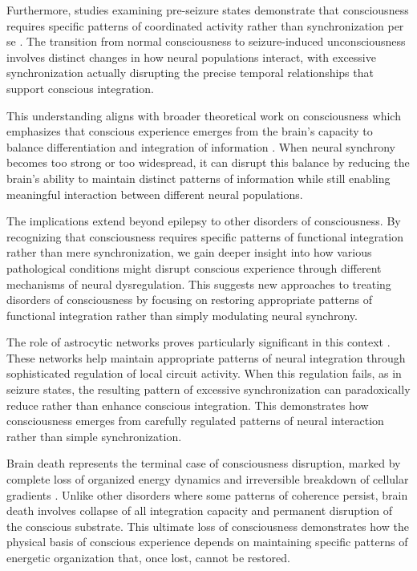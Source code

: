 \begin{refsection}
Furthermore, studies examining pre-seizure states demonstrate that consciousness requires specific patterns of coordinated activity rather than synchronization per se \cite{LeVanQuyen2002}. The transition from normal consciousness to seizure-induced unconsciousness involves distinct changes in how neural populations interact, with excessive synchronization actually disrupting the precise temporal relationships that support conscious integration.

This understanding aligns with broader theoretical work on consciousness which emphasizes that conscious experience emerges from the brain's capacity to balance differentiation and integration of information \cite{Koch2016}. When neural synchrony becomes too strong or too widespread, it can disrupt this balance by reducing the brain's ability to maintain distinct patterns of information while still enabling meaningful interaction between different neural populations.

The implications extend beyond epilepsy to other disorders of consciousness. By recognizing that consciousness requires specific patterns of functional integration rather than mere synchronization, we gain deeper insight into how various pathological conditions might disrupt conscious experience through different mechanisms of neural dysregulation. This suggests new approaches to treating disorders of consciousness by focusing on restoring appropriate patterns of functional integration rather than simply modulating neural synchrony.

The role of astrocytic networks proves particularly significant in this context \cite{Tononi2015}. These networks help maintain appropriate patterns of neural integration through sophisticated regulation of local circuit activity. When this regulation fails, as in seizure states, the resulting pattern of excessive synchronization can paradoxically reduce rather than enhance conscious integration. This demonstrates how consciousness emerges from carefully regulated patterns of neural interaction rather than simple synchronization.

Brain death represents the terminal case of consciousness disruption, marked by complete loss of organized energy dynamics and irreversible breakdown of cellular gradients \cite{Wijdicks2010}. Unlike other disorders where some patterns of coherence persist, brain death involves collapse of all integration capacity and permanent disruption of the conscious substrate. This ultimate loss of consciousness demonstrates how the physical basis of conscious experience depends on maintaining specific patterns of energetic organization that, once lost, cannot be restored.


\end{refsection}

